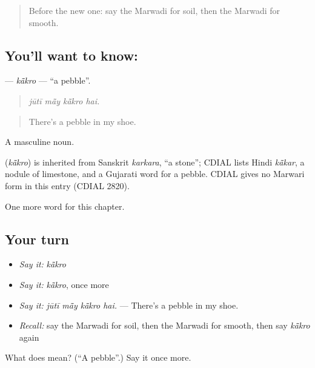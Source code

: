 \begin{quote}
Before the new one: say the Marwadi for soil, then the Marwadi for smooth.
\end{quote}

\subsection*{You'll want to know: }
\textbf{} — \emph{kā̃kro} — \textquotedblleft{}a pebble\textquotedblright{}.

\begin{quote}
   
\end{quote}

\begin{quote}
\emph{jūtī mā̃y kā̃kro hai.}
\end{quote}

\begin{quote}
There's a pebble in my shoe.
\end{quote}

A masculine noun.

\begin{cousinweb}
\textbf{} (\emph{kā̃kro}) is inherited from Sanskrit \emph{karkara}, \textquotedblleft{}a stone\textquotedblright{}; CDIAL lists Hindi \emph{kā̃kar}, a nodule of limestone, and a Gujarati word for a pebble. CDIAL gives no Marwari form in this entry (CDIAL 2820).
\end{cousinweb}

\begin{grammarlens}[title={What you've built}]
One more word for this chapter.
\end{grammarlens}

\subsection*{Your turn}
\begin{itemize}
\raggedright
  \item \emph{Say it:} \emph{kā̃kro}
  \item \emph{Say it:} \emph{kā̃kro}, once more
  \item \emph{Say it:} \emph{jūtī mā̃y kā̃kro hai.} — There's a pebble in my shoe.
  \item \emph{Recall:} say the Marwadi for soil, then the Marwadi for smooth, then say \emph{kā̃kro} again
\end{itemize}

\begin{tcolorbox}[breakable,colback=teal!4,colframe=teal!35!black,title={Before you move on}]
What does  mean? (\textquotedblleft{}A pebble\textquotedblright{}.) Say it once more.
\end{tcolorbox}
